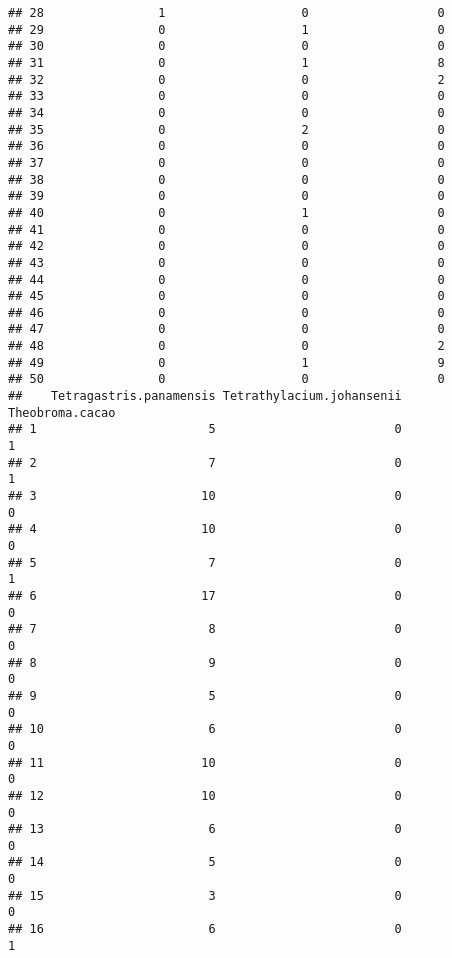 \documentclass[
]{article}
\begin{document}
\begin{verbatim}
## 28                1                   0                  0
## 29                0                   1                  0
## 30                0                   0                  0
## 31                0                   1                  8
## 32                0                   0                  2
## 33                0                   0                  0
## 34                0                   0                  0
## 35                0                   2                  0
## 36                0                   0                  0
## 37                0                   0                  0
## 38                0                   0                  0
## 39                0                   0                  0
## 40                0                   1                  0
## 41                0                   0                  0
## 42                0                   0                  0
## 43                0                   0                  0
## 44                0                   0                  0
## 45                0                   0                  0
## 46                0                   0                  0
## 47                0                   0                  0
## 48                0                   0                  2
## 49                0                   1                  9
## 50                0                   0                  0
##    Tetragastris.panamensis Tetrathylacium.johansenii Theobroma.cacao
## 1                        5                         0               1
## 2                        7                         0               1
## 3                       10                         0               0
## 4                       10                         0               0
## 5                        7                         0               1
## 6                       17                         0               0
## 7                        8                         0               0
## 8                        9                         0               0
## 9                        5                         0               0
## 10                       6                         0               0
## 11                      10                         0               0
## 12                      10                         0               0
## 13                       6                         0               0
## 14                       5                         0               0
## 15                       3                         0               0
## 16                       6                         0               1

\end{verbatim}
\end{document}
